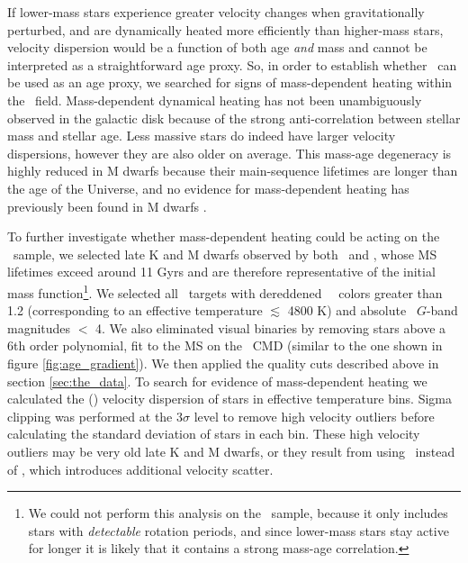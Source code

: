 If lower-mass stars experience greater velocity changes when gravitationally
perturbed, and are dynamically heated more efficiently than higher-mass stars,
velocity dispersion would be a function of both age {\it and} mass and cannot
be interpreted as a straightforward age proxy.
So, in order to establish whether \sigmavb\ can be used as an age proxy, we
searched for signs of mass-dependent heating within the \kepler\ field.
Mass-dependent dynamical heating has not been unambiguously observed in the
galactic disk because of the strong anti-correlation between stellar mass and
stellar age.
Less massive stars do indeed have larger velocity dispersions, however they
are also older on average.
This mass-age degeneracy is highly reduced in M dwarfs because their
main-sequence lifetimes are longer than the age of the Universe, and no
evidence for mass-dependent heating has previously been found in M dwarfs
\citep[\eg][]{faherty2009, newton2016}.

To further investigate whether mass-dependent heating could be acting on the
\kepler\ sample, we selected late K and M dwarfs observed by both \kepler\ and
\gaia, whose MS lifetimes exceed around 11 Gyrs and are therefore
representative of the initial mass function\footnote{We could not perform this
analysis on the \mct\ sample, because it only includes stars with {\it
detectable} rotation periods, and since lower-mass stars stay active for
longer it is likely that it contains a strong mass-age correlation.}.
We selected all \kepler\ targets with dereddened \gaia\ \gcolor\ colors
greater than 1.2 (corresponding to an effective temperature $\lesssim$
4800 K) and absolute \gaia\ $G$-band magnitudes $<$ 4.
We also eliminated visual binaries by removing stars above a 6th order
polynomial, fit to the MS on the \gaia\ CMD (similar to the one shown in
figure \ref{fig:age_gradient}).
We then applied the quality cuts described above in section
\ref{sec:the_data}.
To search for evidence of mass-dependent heating we calculated the (\vb)
velocity dispersion of stars in effective temperature bins.
Sigma clipping was performed at the 3$\sigma$ level to remove high velocity
outliers before calculating the standard deviation of stars in each bin.
These high velocity outliers may be very old late K and M dwarfs, or they
result from using \vb\ instead of \vz, which introduces additional velocity
scatter.

